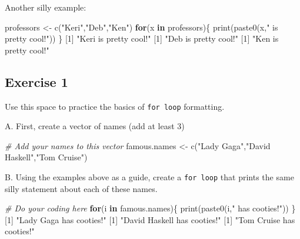 \documentclass[
]{book}
\newenvironment{Shaded}{\begin{snugshade}}{\end{snugshade}}
\newcommand{\CommentTok}[1]{\textcolor[rgb]{0.56,0.35,0.01}{\textit{#1}}}
\newcommand{\ControlFlowTok}[1]{\textcolor[rgb]{0.13,0.29,0.53}{\textbf{#1}}}
\newcommand{\DecValTok}[1]{\textcolor[rgb]{0.00,0.00,0.81}{#1}}
\newcommand{\FunctionTok}[1]{\textcolor[rgb]{0.00,0.00,0.00}{#1}}
\newcommand{\NormalTok}[1]{#1}
\newcommand{\OtherTok}[1]{\textcolor[rgb]{0.56,0.35,0.01}{#1}}
\newcommand{\StringTok}[1]{\textcolor[rgb]{0.31,0.60,0.02}{#1}}
\begin{document}
Another silly example:

\begin{Shaded}
\begin{Highlighting}[]
\NormalTok{professors }\OtherTok{\textless{}{-}} \FunctionTok{c}\NormalTok{(}\StringTok{"Keri"}\NormalTok{,}\StringTok{"Deb"}\NormalTok{,}\StringTok{"Ken"}\NormalTok{) }
\ControlFlowTok{for}\NormalTok{(x }\ControlFlowTok{in}\NormalTok{ professors)\{}
  \FunctionTok{print}\NormalTok{(}\FunctionTok{paste0}\NormalTok{(x,}\StringTok{" is pretty cool!"}\NormalTok{))}
\NormalTok{\}}
\NormalTok{[}\DecValTok{1}\NormalTok{] }\StringTok{"Keri is pretty cool!"}
\NormalTok{[}\DecValTok{1}\NormalTok{] }\StringTok{"Deb is pretty cool!"}
\NormalTok{[}\DecValTok{1}\NormalTok{] }\StringTok{"Ken is pretty cool!"}
\end{Highlighting}
\end{Shaded}

\hypertarget{exercise-1-6}{%
\subsection*{Exercise 1}\label{exercise-1-6}}

Use this space to practice the basics of \texttt{for\ loop} formatting.

A. First, create a vector of names (add at least 3)

\begin{Shaded}
\begin{Highlighting}[]
\CommentTok{\# Add your names to this vector}
\NormalTok{famous.names }\OtherTok{\textless{}{-}} \FunctionTok{c}\NormalTok{(}\StringTok{"Lady Gaga"}\NormalTok{,}\StringTok{"David Haskell"}\NormalTok{,}\StringTok{"Tom Cruise"}\NormalTok{)}
\end{Highlighting}
\end{Shaded}

B. Using the examples above as a guide, create a \texttt{for\ loop} that prints the same silly statement about each of these names.

\begin{Shaded}
\begin{Highlighting}[]
\CommentTok{\# Do your coding here}
\ControlFlowTok{for}\NormalTok{(i }\ControlFlowTok{in}\NormalTok{ famous.names)\{}
  \FunctionTok{print}\NormalTok{(}\FunctionTok{paste0}\NormalTok{(i,}\StringTok{" has cooties!"}\NormalTok{))}
\NormalTok{\}}
\NormalTok{[}\DecValTok{1}\NormalTok{] }\StringTok{"Lady Gaga has cooties!"}
\NormalTok{[}\DecValTok{1}\NormalTok{] }\StringTok{"David Haskell has cooties!"}
\NormalTok{[}\DecValTok{1}\NormalTok{] }\StringTok{"Tom Cruise has cooties!"}
\end{Highlighting}
\end{Shaded}
\end{document}
